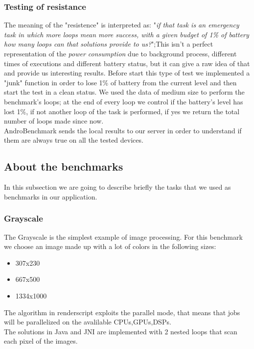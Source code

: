 \documentclass[11pt,english]{article}
\begin{document}
\subsubsection{Testing of resistance}
The meaning of the "resistence" is interpreted as: "\textit{if that task is an emergency task in which more loops mean more success, with a given budget of 1\% of battery how many loops can that solutions provide to us?}";This isn't a perfect representation of the \textit{power consumption} due to background process, different times of executions and different battery status, but it can give a raw idea of that and provide us interesting results.
Before start this type of test we implemented a "junk" function in order to lose 1\% of battery from the current level and then start the test in a clean status.
We used the data of medium size to perform the benchmark's loops; at the end of every loop we control if the battery's level has lost 1\%, if not another loop of the task is performed, if yes we return the total number of loops made since now.\\  
AndroBenchmark sends the local results to our server in order to understand if them are always true on all the tested devices.
\subsection{About the benchmarks}
In this subsection we are going to describe briefly the tasks that we used as benchmarks in our application.
\subsubsection{Grayscale}
The Grayscale is the simplest example of image processing. For this benchmark we choose an image made up with a lot of colors in the following sizes:
\begin{itemize}
\item 307x230 
\item 667x500
\item 1334x1000
\end{itemize}
The algorithm in renderscript exploits the parallel mode, that means that jobs will be parallelized on the avalilable CPUs,GPUs,DSPs.\\The solutions in Java and JNI are implemented with 2 nested loops that scan each pixel of the images.
\end{document}
